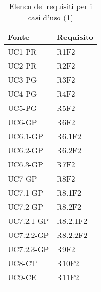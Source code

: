 

		\begin{table}[H]
			\centering
			{\def\arraystretch{1.5}
			\begin{tabularx}{\textwidth}{YY}
				\textbf{Fonte} & \textbf{Requisito} \\
				\toprule
				UC1-PR & R1F2 \\
				UC2-PR & R2F2 \\
				UC3-PG & R3F2 \\
				UC4-PG & R4F2 \\
				UC5-PG & R5F2 \\
				UC6-GP & R6F2 \\
				UC6.1-GP & R6.1F2 \\
				UC6.2-GP & R6.2F2 \\
				UC6.3-GP & R7F2 \\
				UC7-GP & R8F2 \\
				UC7.1-GP & R8.1F2 \\
				UC7.2-GP & R8.2F2 \\
				UC7.2.1-GP & R8.2.1F2 \\
				UC7.2.2-GP & R8.2.2F2 \\
				UC7.2.3-GP & R9F2 \\
				UC8-CT & R10F2 \\
				UC9-CE & R11F2 \\
				\bottomrule \\
			\end{tabularx}}
			\caption{Elenco dei requisiti per i casi d'uso (1)}
		\end{table}


